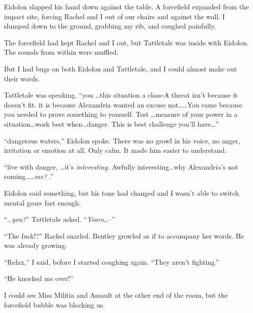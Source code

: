 Eidolon slapped his hand down against the table.  A forcefield expanded from the impact site, forcing Rachel and I out of our chairs and against the wall.  I slumped down to the ground, grabbing my rib, and coughed painfully.



The forcefield had kept Rachel and I out, but Tattletale was inside with Eidolon.  The sounds from within were muffled.



But I had bugs on both Eidolon and Tattletale, and I could almost make out their words.



Tattletale was speaking.  ``\ldotsreason you \ldots this situation a class-A threat isn't because it doesn't fit.  \ldotsdid it is because Alexandria wanted an excuse not\ldots \ldots  You came because you needed to prove something to yourself.  Test \ldots measure of your power in a \ldotsnse situation\ldots work best when\ldots danger.  This is best challenge you'll have\ldots''



``\ldotstreading dangerous waters,'' Eidolon spoke.  There was no growl in his voice, no anger, irritation or emotion at all.  Only calm.  It made him easier to understand.



``\ldotscan live with danger, \ldots it's \emph{interesting.  }Awfully interesting\ldots why Alexandria's not coming\ldots \ldots \emph{me?}  \ldotssecret.''



Eidolon said something, but his tone had changed and I wasn't able to switch mental gears fast enough.



``\ldots\emph{you?}''  Tattletale asked. ``\emph{Years\ldots}--''



``The fuck!?'' Rachel snarled.  Bentley growled as if to accompany her words.  He was already growing.



``Relax,'' I said, before I started coughing again.  ``They aren't fighting.''



``He knocked me over!''



I could see Miss Militia and Assault at the other end of the room, but the forcefield bubble was blocking us.



